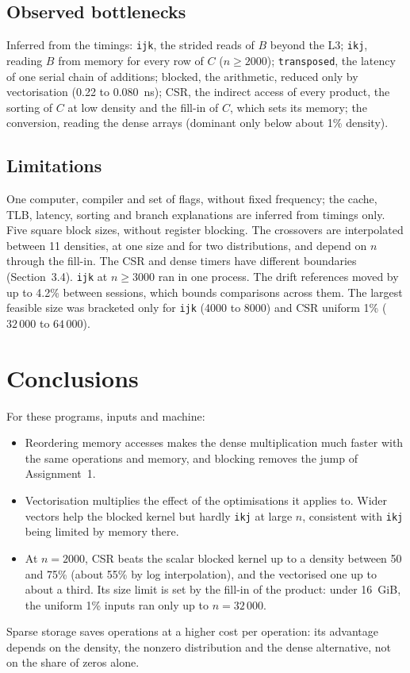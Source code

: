 \documentclass[11pt,a4paper]{article}
\begin{document}
\subsection{Observed bottlenecks}

Inferred from the timings: \texttt{ijk}, the strided reads of $B$ beyond the L3;
\texttt{ikj}, reading $B$ from memory for every row of $C$ ($n \ge 2000$);
\texttt{transposed}, the latency of one serial chain of additions; blocked, the arithmetic,
reduced only by vectorisation (0.22 to 0.080~ns); CSR, the indirect access of every product,
the sorting of $C$ at low density and the fill-in of $C$, which sets its memory; the
conversion, reading the dense arrays (dominant only below about 1\% density).

\subsection{Limitations}

One computer, compiler and set of flags, without fixed frequency; the cache, TLB, latency,
sorting and branch explanations are inferred from timings only. Five square block sizes,
without register blocking. The crossovers are interpolated between 11 densities,
at one size and for two distributions, and depend on $n$ through the fill-in. The CSR and
dense timers have different boundaries (Section~3.4). \texttt{ijk} at $n \ge 3000$ ran in
one process. The drift references moved by up to 4.2\% between sessions, which bounds
comparisons across them. The largest feasible size was bracketed only for \texttt{ijk}
(4000 to 8000) and CSR uniform 1\% ($32\,000$ to $64\,000$).

\section{Conclusions}

For these programs, inputs and machine:
\begin{itemize}
    \item Reordering memory accesses makes the dense multiplication much faster with the same
    operations and memory, and blocking removes the jump of Assignment~1.
    \item Vectorisation multiplies the effect of the optimisations it applies to. Wider
    vectors help the blocked kernel but hardly \texttt{ikj} at large $n$, consistent with
    \texttt{ikj} being limited by memory there.
    \item At $n = 2000$, CSR beats the scalar blocked kernel up to a density between 50 and
    75\% (about 55\% by log interpolation), and the vectorised one up to about a third. Its
    size limit is set by the fill-in of the product: under 16~GiB, the uniform 1\% inputs ran
    only up to $n = 32\,000$.
\end{itemize}
Sparse storage saves operations at a higher cost per operation: its advantage depends on the
density, the nonzero distribution and the dense alternative, not on the share of zeros alone.
\end{document}
